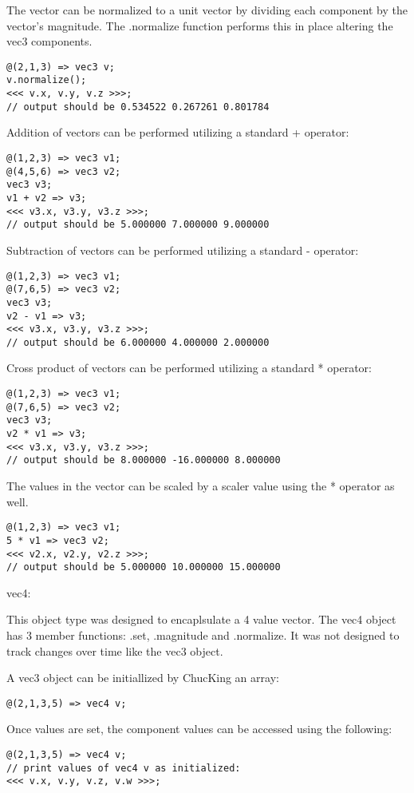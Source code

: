 The vector can be normalized to a unit vector by dividing each component by the
vector's magnitude.  The .normalize function performs this in place altering the
vec3 components.
\begin{verbatim}
@(2,1,3) => vec3 v;
v.normalize();
<<< v.x, v.y, v.z >>>;
// output should be 0.534522 0.267261 0.801784
\end{verbatim}

Addition of vectors can be performed utilizing a standard + operator:
\begin{verbatim}
@(1,2,3) => vec3 v1;
@(4,5,6) => vec3 v2;
vec3 v3;
v1 + v2 => v3;
<<< v3.x, v3.y, v3.z >>>;
// output should be 5.000000 7.000000 9.000000
\end{verbatim}

Subtraction of vectors can be performed utilizing a standard - operator:
\begin{verbatim}
@(1,2,3) => vec3 v1;
@(7,6,5) => vec3 v2;
vec3 v3;
v2 - v1 => v3;
<<< v3.x, v3.y, v3.z >>>;
// output should be 6.000000 4.000000 2.000000
\end{verbatim}

Cross product of vectors can be performed utilizing a standard * operator:
\begin{verbatim}
@(1,2,3) => vec3 v1;
@(7,6,5) => vec3 v2;
vec3 v3;
v2 * v1 => v3;
<<< v3.x, v3.y, v3.z >>>;
// output should be 8.000000 -16.000000 8.000000
\end{verbatim}

The values in the vector can be scaled by a scaler value using the * operator
as well.
\begin{verbatim}
@(1,2,3) => vec3 v1;
5 * v1 => vec3 v2;
<<< v2.x, v2.y, v2.z >>>;
// output should be 5.000000 10.000000 15.000000
\end{verbatim}


vec4:

This object type was designed to encaplsulate a 4 value vector.  The vec4 object
has 3 member functions: .set, .magnitude and .normalize.  It was not designed to
track changes over time like the vec3 object.

A vec3 object can be initiallized by ChucKing an array:
\begin{verbatim}
@(2,1,3,5) => vec4 v;
\end{verbatim}

Once values are set, the component values can be accessed using the following:
\begin{verbatim}
@(2,1,3,5) => vec4 v;
// print values of vec4 v as initialized:
<<< v.x, v.y, v.z, v.w >>>;
\end{verbatim}

